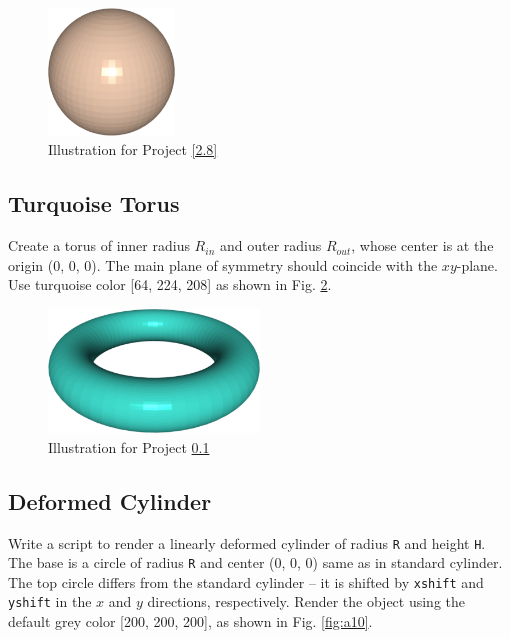 \begin{figure}[!ht]
\begin{center}
\includegraphics[width=0.3\textwidth]{img/a8-sand-sphere.png}
\end{center}
\vspace{-2mm}
\caption{Illustration for Project \ref{2.8}}
\label{fig:a8}
\end{figure}



\subsection{Turquoise Torus}\label{2.9}
Create a torus of inner radius $R_{in}$ and outer radius $R_{out}$, whose center 
is at the origin (0, 0, 0). The main plane of symmetry should coincide with the 
$xy$-plane. Use turquoise color [64, 224, 208] as shown in Fig. \ref{fig:a9}.


\begin{figure}[!ht]
\begin{center}
\includegraphics[width=0.5\textwidth]{img/a9-turquoise-torus.png}
\end{center}
\vspace{-2mm}
\caption{Illustration for Project \ref{2.9}}
\label{fig:a9}
\end{figure}



\subsection{Deformed Cylinder}\label{2.10}
Write a script to render a linearly deformed cylinder of radius {\tt R} and height {\tt H}.
The base is a circle of radius {\tt R} and center (0, 0, 0) same as in standard
cylinder. The top circle differs from the standard cylinder -- it is 
shifted by {\tt xshift} and {\tt yshift} in the $x$ and $y$ directions, respectively. 
Render the object using the default grey color [200, 200, 200],
as shown in Fig. \ref{fig:a10}.

